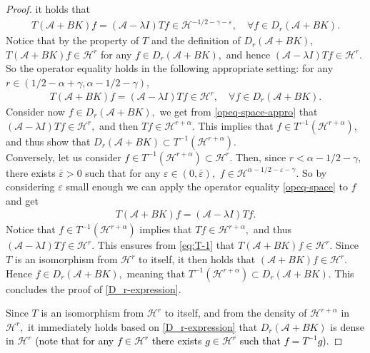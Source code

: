 \documentclass[11pt, dvipsnames]{amsart}
\begin{document}
\begin{proof}
 it holds that
 \begin{align*}
     T(\mathcal{A}+BK)f=(\mathcal{A}-\lambda I)Tf\in \mathcal{H}^{-1/2-\gamma-\varepsilon},\quad \forall f\in D_r(\mathcal{A}+BK).
 \end{align*}
 Notice that by the property of $T$ and the definition of $D_r(\mathcal{A}+BK),$ $T(\mathcal{A}+BK)f\in \mathcal{H}^r$ for any $f\in D_r(\mathcal{A}+BK),$ and hence $(\mathcal{A}-\lambda I)Tf\in \mathcal{H}^{r}.$ So the operator equality holds in the following appropriate setting: for any $r\in (1/2-\alpha+\gamma,\alpha-1/2-\gamma),$
 \begin{align}
     T(\mathcal{A}+BK)f=(\mathcal{A}-\lambda I)Tf\in \mathcal{H}^{r},\quad \forall f\in D_r(\mathcal{A}+BK).\label{opeq-space-appro}
 \end{align}
 Consider now $f\in D_r(\mathcal{A}+BK),$ we get from \eqref{opeq-space-appro} that $(\mathcal{A}-\lambda I)Tf\in \mathcal{H}^r,$ and then $Tf\in \mathcal{H}^{r+\alpha}.$ This implies that $f\in T^{-1}(\mathcal{H}^{r+\alpha}),$ and thus show that $D_r(\mathcal{A}+BK)\subset T^{-1}(\mathcal{H}^{r+\alpha}).$\\
 Conversely, let us consider $f\in T^{-1}(\mathcal{H}^{r+\alpha})\subset \mathcal{H}^r.$ Then, since $r<\alpha-1/2-\gamma,$ there exists $\bar{\varepsilon} >0$ such that for any $\varepsilon\in (0,\bar{\varepsilon}),$ $f\in \mathcal{H}^{\alpha-1/2-\varepsilon-\gamma}.$ So by considering $\varepsilon$ small enough we can apply the operator equality \eqref{opeq-space} to $f$ and get 
 \begin{align}
    T(\mathcal{A}+BK)f=(\mathcal{A}-\lambda I)Tf.\label{eq:T-1}
 \end{align} Notice that $f\in T^{-1}(\mathcal{H}^{r+\alpha})$ implies that $Tf\in \mathcal{H}^{r+\alpha},$ and thus $(\mathcal{A}-\lambda I)Tf\in \mathcal{H}^{r}.$ This ensures from \eqref{eq:T-1} that $T(\mathcal{A}+BK)f\in \mathcal{H}^{r}.$ Since $T$ is an isomorphism from $\mathcal{H}^{r}$ to itself, it then holds that $(\mathcal{A}+BK)f\in \mathcal{H}^{r}.$ Hence $f\in D_r(\mathcal{A}+BK),$ meaning that $T^{-1}(\mathcal{H}^{r+\alpha})\subset D_r(\mathcal{A}+BK).$ This concludes the proof of \eqref{D_r-expression}.

 Since $T$ is an isomorphism from $\mathcal{H}^{r}$ to itself, and from the density of $\mathcal{H}^{r+\alpha}$ in $\mathcal{H}^{r},$ it immediately holds based on \eqref{D_r-expression} that $D_r(\mathcal{A}+BK)$ is dense in $\mathcal{H}^{r}$ \textcolor{black}{(note that for any $f\in\mathcal{H}^{r}$ there exists $g\in \mathcal{H}^{r}$ such that $f = T^{-1}g$).}


\end{proof}
\end{document}
